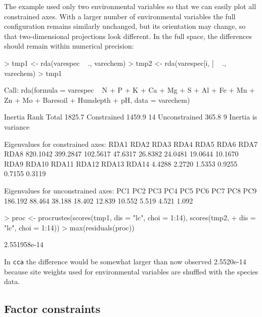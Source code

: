 \documentclass[a4paper,10pt]{amsart}
\begin{document}
The example used only two environmental variables so that we can
easily plot all constrained axes.  With a larger number of
environmental variables the full configuration remains similarly
unchanged, but its orientation may change, so that two-dimensional
projections look different.  In the full space, the differences should
remain within numerical precision:
\begin{Schunk}
\begin{Sinput}
> tmp1 <- rda(varespec ~ ., varechem)
> tmp2 <- rda(varespec[i, ] ~ ., varechem)
> tmp1
\end{Sinput}
\begin{Soutput}
Call:
rda(formula = varespec ~ N + P + K + Ca + Mg + S + Al + Fe +      Mn + Zn + Mo + Baresoil + Humdepth + pH, data = varechem) 

              Inertia Rank
Total          1825.7     
Constrained    1459.9   14
Unconstrained   365.8    9
Inertia is variance 

Eigenvalues for constrained axes:
    RDA1     RDA2     RDA3     RDA4     RDA5     RDA6     RDA7     RDA8 
820.1042 399.2847 102.5617  47.6317  26.8382  24.0481  19.0644  10.1670 
    RDA9    RDA10    RDA11    RDA12    RDA13    RDA14 
  4.4288   2.2720   1.5353   0.9255   0.7155   0.3119 

Eigenvalues for unconstrained axes:
    PC1     PC2     PC3     PC4     PC5     PC6     PC7     PC8     PC9 
186.192  88.464  38.188  18.402  12.839  10.552   5.519   4.521   1.092 
\end{Soutput}
\begin{Sinput}
> proc <- procrustes(scores(tmp1, dis = "lc", choi = 1:14), scores(tmp2, 
+     dis = "lc", choi = 1:14))
> max(residuals(proc))
\end{Sinput}
\begin{Soutput}
[1] 2.551958e-14
\end{Soutput}
\end{Schunk}
In \texttt{cca} the difference would be somewhat larger than now
observed 2.5520e-14 because site
weights used for environmental variables are shuffled with the species
data.

\subsection{Factor constraints}
\end{document}
